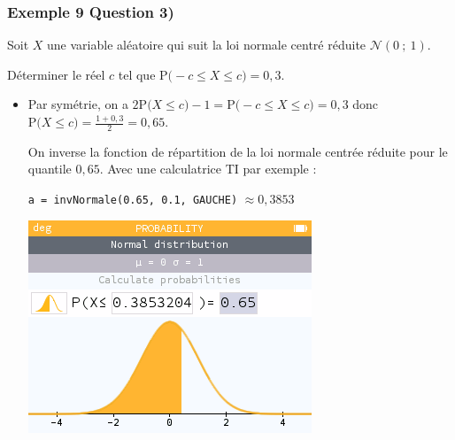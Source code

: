 \documentclass[xcolor=svgnames,t,final]{beamer}
\newcommand{\loinorm}[2]{\mathcal{N}\left(#1\ ; \ #2 \right)}
\newcommand{\proba}[1]{\text{P}\big(#1\big)}
\begin{document}
\begin{frame}
\frametitle{Exemple 9 Question 3)}

Soit $X$ une variable aléatoire qui suit la loi normale centré réduite $\loinorm{0}{1}$.

Déterminer le réel $c$ tel que   $\proba{ -c \leqslant X \leqslant c}=0,3$. 
\begin{itemize}
\pause \item  Par symétrie, on a $2\proba{X \leqslant c}-1=\proba{ -c \leqslant X \leqslant c}=0,3$ donc $\proba{X \leqslant c}=\frac{1+0,3}{2}=0,65$.

On inverse la fonction de répartition de la loi normale centrée réduite pour le quantile $0,65$. Avec une calculatrice TI par exemple : 

 \texttt{a = invNormale(0.65, 0.1, GAUCHE)} $\approx 0,3853$

\begin{center}
\includegraphics[scale=0.3]{images/exemple9-fig3.png}
\end{center}
\end{itemize}

\end{frame}
\end{document}
